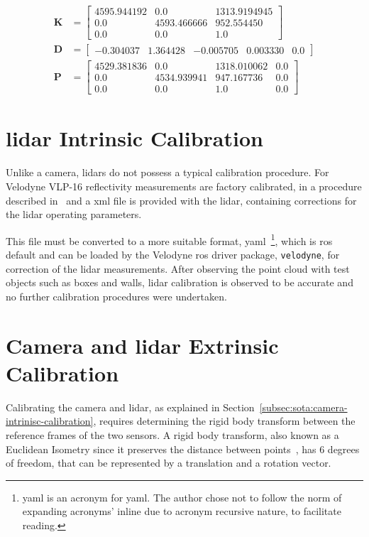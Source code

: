 \begin{subequations}
	\label{eq:camera-calibration-results}
	\begin{align}
		\mathbf{K} & = 
		\begin{bmatrix}
			4595.944192 & 0.0         &  1313.9194945 \\
			0.0         & 4593.466666 &  952.554450 \\
			0.0         & 0.0         &  1.0
		\end{bmatrix} \nonumber \\
		\mathbf{D} & = 
		\begin{bmatrix}
			-0.304037 & 1.364428 &  -0.005705 & 0.003330 & 0.0
		\end{bmatrix} \nonumber \\
		\mathbf{P} & = 
		\begin{bmatrix}
			4529.381836 & 0.0         & 1318.010062 & 0.0 \\
			0.0         & 4534.939941 & 947.167736  & 0.0 \\
			0.0         & 0.0         & 1.0         & 0.0 
		\end{bmatrix}
		\nonumber
	\end{align}
\end{subequations}

	

\section{\acs{lidar} Intrinsic Calibration}
\label{sec:calibration:lidar}
Unlike a camera, \acp{lidar} do not possess a typical calibration procedure. For Velodyne VLP-16 reflectivity measurements are factory calibrated, in a procedure described in~\cite{VLP16} and a \ac{xml} file is provided with the \ac{lidar}, containing corrections for the \ac{lidar} operating parameters.

This file must be converted to a more suitable format, \acs{yaml}~\footnote{\acs{yaml} is an acronym for \acl{yaml}. The author chose not to follow the norm of expanding acronyms' inline due to acronym recursive nature, to facilitate reading.}, which is \ac{ros} default and can be loaded by the Velodyne \ac{ros} driver package, \texttt{velodyne}, for correction of the \ac{lidar} measurements. After observing the point cloud with test objects such as boxes and walls, \ac{lidar} calibration is observed to be accurate and no further calibration procedures were undertaken.

\section{Camera and \ac{lidar} Extrinsic Calibration}
\label{sec:calibration:extrinsic}
Calibrating the camera and \ac{lidar}, as explained in Section~\ref{subsec:sota:camera-intrinisc-calibration}, requires determining the rigid body transform between the reference frames of the two sensors. A rigid body transform, also known as a Euclidean Isometry since it preserves the distance between points~\cite{mvg_book}, has 6 degrees of freedom, that can be represented by a translation and a rotation vector.

